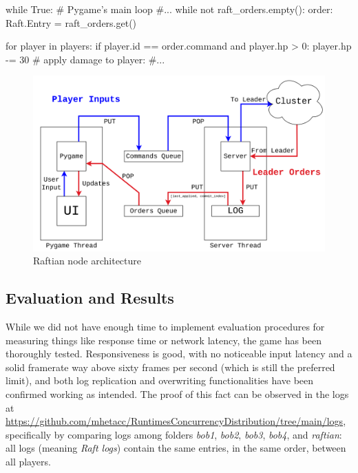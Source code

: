 \begin{python}[label={code:updateUI}, caption={Pygame periodically checks whether there are new orders and updates the UI accordingly}]
while True: # Pygame's main loop
    #...
    while not raft_orders.empty():
        order: Raft.Entry = raft_orders.get()

        for player in players:
            if player.id == order.command and player.hp > 0:
                player.hp -= 30  # apply damage to player:
                #...
\end{python}

\begin{figure}[h]
  \centering
  \includegraphics[width=\linewidth]{images/nodeArchitecture.png}
  
  \caption{Raftian node architecture}
  \label{fig:raftianArch}
\end{figure}

\subsection{Evaluation and Results}

While we did not have enough time to implement evaluation procedures for measuring things like response time or network latency, the game has been thoroughly tested. Responsiveness is good, with no noticeable input latency and a solid framerate way above sixty frames per second (which is still the preferred limit), and both log replication and overwriting functionalities have been confirmed working as intended. The proof of this fact can be observed in the logs at \url{https://github.com/mhetacc/RuntimesConcurrencyDistribution/tree/main/logs}, specifically by comparing logs among folders \textit{bob1}, \textit{bob2}, \textit{bob3}, \textit{bob4}, and \textit{raftian}: all logs (meaning \textit{Raft logs}) contain the same entries, in the same order, between all players.
